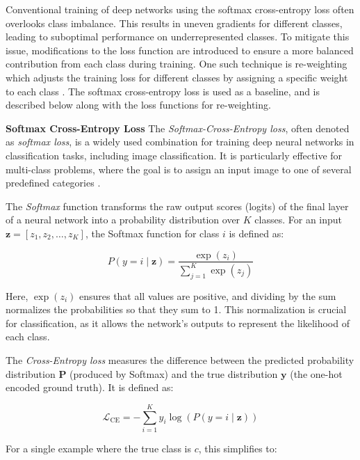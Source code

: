 Conventional training of deep networks using the softmax cross-entropy loss often overlooks class imbalance. This results in uneven gradients for different classes, leading to suboptimal performance on underrepresented classes. To mitigate this issue, modifications to the loss function are introduced to ensure a more balanced contribution from each class during training. One such technique is re-weighting which adjusts the training loss for different classes by assigning a specific weight to each class \cite{zhang2023deep}. The softmax cross-entropy loss is used as a baseline, and is described below along with the loss functions for re-weighting.

\myindent \textbf{Softmax Cross-Entropy Loss}
The \textit{Softmax-Cross-Entropy loss}, often denoted as \textit{softmax loss}, is a widely used combination for training deep neural networks in classification tasks, including image classification. It is particularly effective for multi-class problems, where the goal is to assign an input image to one of several predefined categories \cite{cs231n} \cite{pytorch_crossentropy}.

The \textit{Softmax} function transforms the raw output scores (logits) of the final layer of a neural network into a probability distribution over \( K \) classes. For an input \( \mathbf{z} = [z_1, z_2, \dots, z_K] \), the Softmax function for class \( i \) is defined as:

\begin{equation}
    P(y = i \mid \mathbf{z}) = \frac{\exp(z_i)}{\sum_{j=1}^{K} \exp(z_j)}
\end{equation}

Here, \( \exp(z_i) \) ensures that all values are positive, and dividing by the sum normalizes the probabilities so that they sum to 1. This normalization is crucial for classification, as it allows the network's outputs to represent the likelihood of each class.

The \textit{Cross-Entropy loss} measures the difference between the predicted probability distribution \( \mathbf{P} \) (produced by Softmax) and the true distribution \( \mathbf{y} \) (the one-hot encoded ground truth). It is defined as:

\begin{equation}
    \mathcal{L}_{\text{CE}} = -\sum_{i=1}^{K} y_i \log(P(y = i \mid \mathbf{z}))
\end{equation}


For a single example where the true class is \( c \), this simplifies to:

